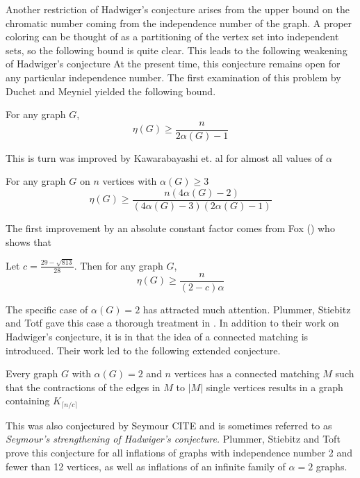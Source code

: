 Another restriction of Hadwiger's  conjecture arises from the upper bound on the chromatic number coming from the independence number of the graph.  A proper coloring can be thought of as a partitioning of the vertex set into independent sets, so the following bound is quite clear.
This leads to the following weakening of Hadwiger's conjecture
At the present time, this conjecture remains open for any particular independence number.  The first examination of this problem by Duchet and Meyniel yielded the following bound.
\begin{theorem}
	For any graph $G$, 
\[\eta(G) \geq \frac{n}{2\alpha(G) -1}\]
\end{theorem}
This is turn was improved by Kawarabayashi et. al for almost all values of $\alpha$
\begin{theorem}
	For any graph $G$ on $n$ vertices with $\alpha(G) \geq 3$
\[\eta(G) \geq \frac{n(4\alpha(G)-2)}{(4\alpha(G)-3)(2\alpha(G)-1)}\]
\end{theorem}
The first improvement by an absolute constant factor comes from Fox (\cite{fox}) who shows that 
\begin{theorem}
	Let $c = \frac{29-\sqrt{813}}{28}$.  Then for any graph $G$,
\[\eta(G) \geq \frac{n}{(2-c)\alpha}\]
\end{theorem}

The specific case of $\alpha(G) = 2$ has attracted much attention.  Plummer, Stiebitz and Totf gave this case a thorough treatment in \cite{PST}.  In addition to their work on Hadwiger's conjecture, it is in \cite{PST} that the idea of a connected matching is introduced.  Their work led to the following extended conjecture.

\begin{conj} Every graph $G$ with $\alpha(G) = 2$ and $n$ vertices has a connected matching $M$ such that the contractions of the edges in $M$ to $|M|$ single vertices results in a graph containing $K_{\lceil n/c \rceil} $ 
\end{conj}

This was also conjectured by Seymour CITE and is sometimes referred to as {\it Seymour's strengthening of Hadwiger's conjecture.}  Plummer, Stiebitz and Toft prove this conjecture for all inflations of graphs with independence number 2 and fewer than 12 vertices, as well as inflations of an infinite family of $\alpha = 2$ graphs.

